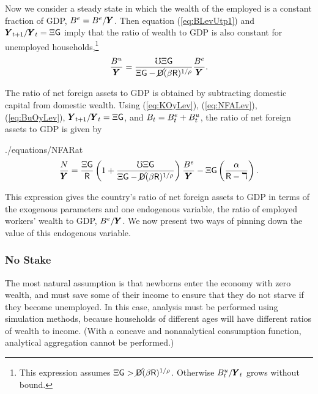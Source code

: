 \documentclass[titlepage,abstract,letterpaper]{econtex}
\renewcommand{\GDPLev}{\ensuremath{\pmb{Y}}}
\begin{document}
Now we consider a steady state in which the wealth of the employed is a constant fraction of GDP, $\BRatE = \BLevE /\GDPLev$. Then equation (\ref{eq:BLevUtp1}) and $\GDPLev_{t+1}/\GDPLev_t=\EmpGro \WGro$  imply that the ratio of wealth to GDP is also constant for unemployed households,\footnote{This expression assumes $\Xi \mathsf{G} >\cancel{\mathsf{D}}(\beta \mathsf{R} )^{1/\rho}$. Otherwise $\BLevU_{t} / \GDPLev_t$ grows without bound.}
\begin{equation}
\frac{\BLevU}{\GDPLev}= \frac{\urate \EmpGro \WGro}{\EmpGro \WGro -\PLives(\Discount \Rfree )^{1/\CRRA}} \frac{\BLevE}{\GDPLev}.
\label{eq:BuOyLev}
\end{equation}



The ratio of net foreign assets to GDP is obtained by subtracting domestic capital from domestic wealth. Using (\ref{eq:KOyLev}), (\ref{eq:NFALev}), (\ref{eq:BuOyLev}), $\GDPLev_{t+1}/\GDPLev_t=\EmpGro \WGro$, and $B_t=B^{e}_t+B^{u}_{t}$, the ratio of net foreign assets to GDP is given by
\begin{verbatimwrite}{./equations/NFARat}
\begin{equation}
\frac{\NFALev}{\GDPLev}= \frac{\EmpGro \WGro}{\Rfree} \left( 1 + \frac{\urate \EmpGro \WGro}{\EmpGro \WGro -\PLives(\Discount \Rfree )^{1/\CRRA}} \right) \frac{\BLevE}{\GDPLev} -\EmpGro \WGro\left( \frac{\kapShare}{\Rfree-\DeprFac}\right).
\label{eq:NFARat}
\end{equation}
\end{verbatimwrite}

This expression gives the country's ratio of net foreign assets to GDP in terms of the exogenous parameters and one endogenous variable, the ratio of employed workers' wealth to GDP, $\BLevE/\GDPLev$. We now present two ways of pinning down the value of this endogenous variable.


\subsubsection{No Stake}

The most natural assumption is that newborns enter the economy with zero wealth, and must save some of their income to ensure that they do not starve
if they become unemployed.
In this case, analysis must be performed using simulation methods, because households of different ages will have different ratios of wealth to income.  (With a concave and nonanalytical consumption function, analytical aggregation cannot be performed.)
\end{document}
